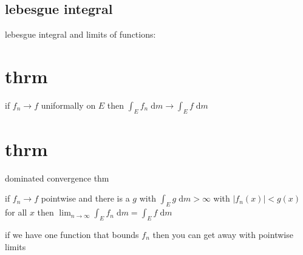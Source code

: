 \documentclass[letterpaper]{article}
\begin{document}
\subsection*{lebesgue integral}
lebesgue integral and limits of functions:
\section*{thrm}
if $f_n\to f$ uniformally on $E$ then $\int_E{f_n\;\mathrm{d}m}\to \int_E{f\;\mathrm{d}m}$

\section*{thrm}
dominated convergence thm

if $f_n\to f$ pointwise and there is a $g$ with $\int_E{g\;\mathrm{d}m}>\infty$ with $|f_n(x)|<g(x)$ for all $x$ then $\lim_{n\to\infty}\int_E{f_n\;\mathrm{d}m}=\int_E{f\;\mathrm{d}m}$

if we have one function that bounds $f_n$ then you can get away with pointwise limits
\end{document}
